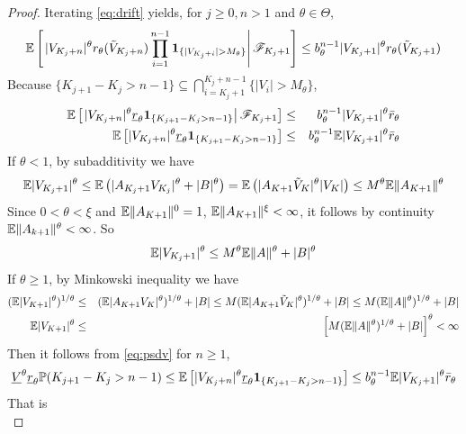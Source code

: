\begin{proof}
  Iterating \eqref{eq:drift} yields, for $j \geq 0, n > 1$ and $\theta \in \Theta$,
  \[
  \mathbb{E} \left[
    \left.
    |V_{K_j + n}|^\theta r_{\theta}(\tilde V_{K_j + n})
    \prod_{i=1}^{n-1}\mathbf{1}_{\{|V_{K_j + i}| > M_{\theta}\}}
    \right| \mathscr F_{K_j + 1}
    \right]
  \leq b_{\theta}^{n-1} |V_{K_j + 1}|^\theta r_{\theta}(\tilde V_{K_j+1})
  \]
  Because
  $\{K_{j+1} - K_j > n - 1\} \subseteq \bigcap_{i=K_j + 1}^{K_j + n-1}\{|V_i| > M_{\theta}\}$,
  \begin{eqnarray}
    \mathbb{E} \left[\left.
      |V_{K_j + n}|^\theta \underline r_{\theta}
      \mathbf{1}_{\{K_{j+1} - K_j > n - 1\}}
      \right| \mathscr F_{K_j + 1}
      \right]
    &\leq&
    b_{\theta}^{n-1} |V_{K_j + 1}|^\theta \bar r_{\theta}
    \nonumber \\
    \mathbb{E} \left[
      |V_{K_j + n}|^\theta \underline r_{\theta}
      \mathbf{1}_{\{K_{j+1} - K_j > n - 1\}}
      \right]
    &\leq&
    b_{\theta}^{n-1} \mathbb{E} |V_{K_j + 1}|^\theta \bar
    r_{\theta}
    \label{eq:psdv}
  \end{eqnarray}
  If $\theta < 1$, by subadditivity we have
  \begin{eqnarray*}
    \mathbb{E} |V_{K_j + 1}|^\theta
    \leq
    \mathbb{E} \left(
    |A_{K_j + 1} V_{K_j}|^\theta + |B|^\theta
    \right)
    =
    \mathbb{E} \left(
    |A_{K+1} \tilde V_{K}|^\theta |V_K|
    \right)
    \leq
    M^\theta \mathbb{E} \|A_{K+1}\|^\theta
  \end{eqnarray*}
  Since $0 < \theta < \xi$ and $\mathbb{E} \|A_{K+1} \|^0 = 1$, $\mathbb{E} \|A_{K+1} \|^\xi < \infty$,
  it follows by continuity $\mathbb{E} \|A_{k+1}\|^\theta < \infty$. So
  \[
  \mathbb{E} |V_{K_j + 1}|^\theta \leq M^\theta \mathbb{E} \|A\|^\theta + |B|^\theta
  \]
  If $\theta \geq 1$, by Minkowski inequality we have
  \begin{eqnarray*}
    (\mathbb{E} |V_{K+1}|^\theta)^{1/\theta}
    &\leq&
    (\mathbb{E} |A_{K+1} V_K|^\theta)^{1/\theta} + |B|
    \leq
    M (\mathbb{E} |A_{K+1} \tilde V_{K}|^\theta)^{1/\theta} + |B|
    \leq
    M (\mathbb{E} \|A\|^\theta)^{1/\theta} + |B| \\
    \mathbb{E} |V_{K+1}|^\theta
    &\leq&
    \left[
      M (\mathbb{E} \|A\|^\theta)^{1/\theta} + |B|      
    \right]^\theta < \infty
  \end{eqnarray*}
  Then it follows from \eqref{eq:psdv} for $n \geq 1$,
  \[
  \underline V^\theta \underline r_\theta
  \mathbb{P}(K_{j+1} - K_j > n - 1)
  \leq
  \mathbb{E} \left[
    |V_{K_j + n}|^\theta \underline r_{\theta}
    \mathbf{1}_{\{K_{j+1} - K_j > n - 1\}}
    \right]
  \leq
  b_{\theta}^{n-1} \mathbb{E} |V_{K_j + 1}|^\theta \bar
  r_{\theta}
  \]
  That is
  \begin{equation}

\end{equation}
\end{proof}
